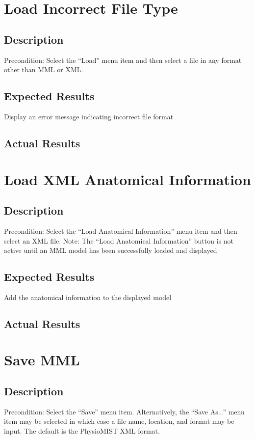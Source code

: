 \documentclass{article}
\begin{document}
\section{Load Incorrect File Type}
\subsection{Description}
Precondition: Select the ``Load'' menu item and then select a file in any format other than MML or XML.
\subsection{Expected Results}
Display an error message indicating incorrect file format
\subsection{Actual Results}

\section{Load XML Anatomical Information}
\subsection{Description}
Precondition: Select the ``Load Anatomical Information'' menu item and then select an XML file.
Note: The ``Load Anatomical Information'' button is not active until an MML model has been successfully loaded and displayed
\subsection{Expected Results}
Add the anatomical information to the displayed model
\subsection{Actual Results}

\section{Save MML}
\subsection{Description}
Precondition: Select the ``Save'' menu item.  Alternatively, the ``Save As...'' menu item may be selected in which case a file name, location, and format may be input.  The default is the PhysioMIST XML format.
\end{document}
